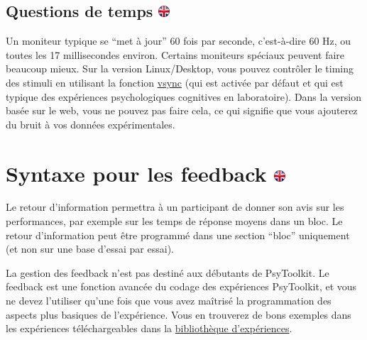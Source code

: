 \documentclass[
]{book}
\begin{document}
\hypertarget{questions-de-temps-ukflag}{%
\subsection[Questions de temps ]{\texorpdfstring{Questions de temps
\href{https://www.psytoolkit.org/doc3.1.0/stimuli.html\#_timing_issues}{\protect\includegraphics{img/ukflag.png}}}{Questions de temps ukflag}}\label{questions-de-temps-ukflag}}

Un moniteur typique se ``met à jour'' 60 fois par seconde, c'est-à-dire
60 Hz, ou toutes les 17 millisecondes environ. Certains moniteurs
spéciaux peuvent faire beaucoup mieux. Sur la version Linux/Desktop,
vous pouvez contrôler le timing des stimuli en utilisant la fonction
\protect\hyperlink{vsync}{vsync} (qui est activée par défaut et qui est
typique des expériences psychologiques cognitives en laboratoire). Dans
la version basée sur le web, vous ne pouvez pas faire cela, ce qui
signifie que vous ajouterez du bruit à vos données expérimentales.

\hypertarget{syntaxe-pour-les-feedback-ukflag}{%
\section[Syntaxe pour les feedback ]{\texorpdfstring{Syntaxe pour les
feedback
\href{https://www.psytoolkit.org/doc3.1.0/feedback.html}{\protect\includegraphics{img/ukflag.png}}}{Syntaxe pour les feedback ukflag}}\label{syntaxe-pour-les-feedback-ukflag}}

Le retour d'information permettra à un participant de donner son avis
sur les performances, par exemple sur les temps de réponse moyens dans
un bloc. Le retour d'information peut être programmé dans une section
``bloc'' uniquement (et non sur une base d'essai par essai).

La gestion des feedback n'est pas destiné aux débutants de PsyToolkit.
Le feedback est une fonction avancée du codage des expériences
PsyToolkit, et vous ne devez l'utiliser qu'une fois que vous avez
maîtrisé la programmation des aspects plus basiques de l'expérience.
Vous en trouverez de bons exemples dans les expériences téléchargeables
dans la
\href{http://www.psytoolkit.org/experiment-library/}{bibliothèque
d'expériences}.
\end{document}
